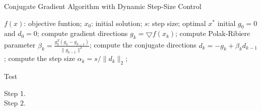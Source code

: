 \documentclass[UTF8]{article}
\begin{document}
\begin{algorithm}[h]
\caption{Conjugate Gradient Algorithm with Dynamic Step-Size Control}
\label{alg::conjugateGradient}
\begin{algorithmic}[1]
\Require
$f(x)$: objective funtion;
$x_0$: initial solution;
$s$: step size;
\Ensure
optimal $x^{*}$
\State initial $g_0=0$ and $d_0=0$;
\Repeat
\State compute gradient directions $g_k=\bigtriangledown f(x_k)$;
\State compute Polak-Ribiere parameter $\beta_k=\frac{g_k^{T}(g_k-g_{k-1})}{\parallel g_{k-1} \parallel^{2}}$;
\State compute the conjugate directions $d_k=-g_k+\beta_k d_{k-1}$;
\State compute the step size $\alpha_k=s/\parallel d_k \parallel_{2}$;
\end{algorithmic}
\end{algorithm}


\iffalse
\section{Style 4.}
\usepackage[linesnumbered,boxed]{algorithm2e}

\begin{algorithm}
\caption{identifyRowContext}
\KwIn{$r_i$, $Backgrd(T_i)$=${T_1,T_2,\ldots ,T_n}$ and similarity threshold $\theta_r$}
\KwOut{$con(r_i)$}
$con(r_i)= \Phi$\;
\For{$j=1;j \le n;j \ne i$}
{
float $maxSim=0$\;
$r^{maxSim}=null$\;
\While{not end of $T_j$}
{
compute Jaro($r_i,r_m$)($r_m\in T_j$)\;
\If{$(Jaro(r_i,r_m) \ge \theta_r)\wedge (Jaro(r_i,r_m)\ge r^{maxSim})$}
{
replace $r^{maxSim}$ with $r_m$\;
}
}
$con(r_i)=con(r_i)\cup {r^{maxSim}}$\;
}
return $con(r_i)$\;
\end{algorithm}

如果想要去掉算法中的竖线:

在\begin{algorithm}之后加入\SetAlgoNoLine

\fi

\begin{algorithm}[h]
\caption{Test}
\begin{algorithmic}[1]

\begin{description}
  \item[Step 1.]
  \item[Step 2.]
\end{description}

\end{algorithmic}
\end{algorithm}
\end{document}
